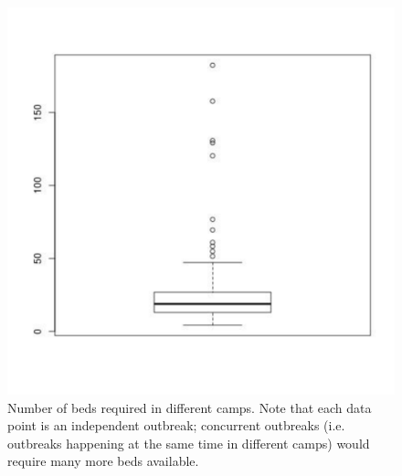 \documentclass{article}
\begin{document}
\begin{figure}[ht]
    \includegraphics[width=.95\linewidth]{beds_box}
    \caption{Number of beds required in different camps. Note that each data
point is an independent outbreak; concurrent outbreaks (i.e. outbreaks
happening at the same time in different camps) would require many more beds
available.}\label{fig:beds}
\end{figure}
\end{document}
